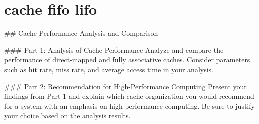 \documentclass{article}%
\begin{document}
%
\section{\textbf{cache fifo lifo}}%
\label{sec:textbfcachefifolifo}%
## Cache Performance Analysis and Comparison

### Part 1: Analysis of Cache Performance
Analyze and compare the performance of direct-mapped and fully associative caches. Consider parameters such as hit rate, miss rate, and average access time in your analysis. 

### Part 2: Recommendation for High-Performance Computing
Present your findings from Part 1 and explain which cache organization you would recommend for a system with an emphasis on high-performance computing. Be sure to justify your choice based on the analysis results.

%
\end{document}
